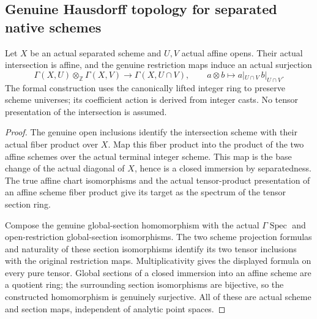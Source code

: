\subsection{Genuine Hausdorff topology for separated native schemes}
\label{subsec:native-separated-topology}

\begin{theorem}
\label{scheme:separated-section-tensor}
\leanok
Let $X$ be an actual separated scheme and $U,V$ actual affine opens.
Their actual intersection is affine, and the genuine restriction maps induce
an actual surjection
\[
 \Gamma(X,U)\otimes_{\mathbb Z}\Gamma(X,V)
 \longrightarrow \Gamma(X,U\cap V),
 \qquad a\otimes b\longmapsto a|_{U\cap V}\,b|_{U\cap V}.
\]
The formal construction uses the canonically lifted integer ring to preserve
scheme universes; its coefficient action is derived from integer casts.
No tensor presentation of the intersection is assumed.
\end{theorem}
\begin{proof}
The genuine open inclusions identify the intersection scheme with their
actual fiber product over $X$. Map this fiber product into the product of
the two affine schemes over the actual terminal integer scheme. This map
is the base change of the actual diagonal of $X$, hence is a closed
immersion by separatedness. The true affine chart isomorphisms and the
actual tensor-product presentation of an affine scheme fiber product give
its target as the spectrum of the tensor section ring.

Compose the genuine global-section homomorphism with the actual
$\Gamma\operatorname{Spec}$ and open-restriction global-section isomorphisms.
The two scheme projection formulas and naturality of these section
isomorphisms identify its two tensor inclusions with the original
restriction maps. Multiplicativity gives the displayed formula on every
pure tensor. Global sections of a closed immersion into an affine scheme
are a quotient ring; the surrounding section isomorphisms are bijective,
so the constructed homomorphism is genuinely surjective. All of these
are actual scheme and section maps, independent of analytic point spaces.
\end{proof}

